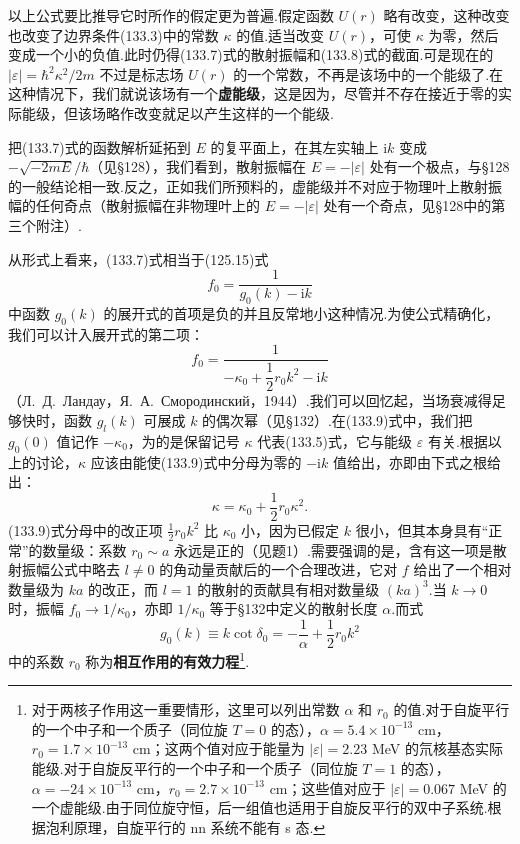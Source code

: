 以上公式要比推导它时所作的假定更为普遍.假定函数 $U(r)$ 略有改变，这种改变也改变了边界条件(133.3)中的常数 $\kappa$ 的值.适当改变 $U(r)$，可使 $\kappa$ 为零，然后变成一个小的负值.此时仍得(133.7)式的散射振幅和(133.8)式的截面.可是现在的 $|\varepsilon|=\hbar^2\kappa^2/2m$ 不过是标志场 $U(r)$ 的一个常数，不再是该场中的一个能级了.在这种情况下，我们就说该场有一个\textbf{虚能级}，这是因为，尽管并不存在接近于零的实际能级，但该场略作改变就足以产生这样的一个能级.

把(133.7)式的函数解析延拓到 $E$ 的复平面上，在其左实轴上 $\mathrm{i}k$ 变成 $-\sqrt{-2mE}/\hbar$（见§128），我们看到，散射振幅在 $E=-|\varepsilon|$ 处有一个极点，与§128的一般结论相一致.反之，正如我们所预料的，虚能级并不对应于物理叶上散射振幅的任何奇点（散射振幅在非物理叶上的 $E=-|\varepsilon|$ 处有一个奇点，见§128中的第三个附注）.

从形式上看来，(133.7)式相当于(125.15)式
\begin{equation*}
  f_0=\frac{1}{g_0(k)-\mathrm{i}k}
\end{equation*}
中函数 $g_0(k)$ 的展开式的首项是负的并且反常地小这种情况.为使公式精确化，我们可以计入展开式的第二项：
\begin{equation}
  f_0=\frac{1}{-\kappa_0+\dfrac{1}{2}r_0k^2-\mathrm{i}k}
\end{equation}
（Л.~Д.~Ландау，Я.~А.~Смородинский，1944）.我们可以回忆起，当场衰减得足够快时，函数 $g_l(k)$ 可展成 $k$ 的偶次幂（见§132）.在(133.9)式中，我们把 $g_0(0)$ 值记作 $-\kappa_0$，为的是保留记号 $\kappa$ 代表(133.5)式，它与能级 $\varepsilon$ 有关.根据以上的讨论，$\kappa$ 应该由能使(133.9)式中分母为零的 $-\mathrm{i}k$ 值给出，亦即由下式之根给出：
\begin{equation}
  \kappa=\kappa_0+\frac{1}{2}r_0\kappa^2.
\end{equation}
(133.9)式分母中的改正项 $\frac{1}{2}r_0k^2$ 比 $\kappa_0$ 小，因为已假定 $k$ 很小，但其本身具有“正常”的数量级：系数 $r_0\sim a$ 永远是正的（见题1）.需要强调的是，含有这一项是散射振幅公式中略去 $l\neq0$ 的角动量贡献后的一个合理改进，它对 $f$ 给出了一个相对数量级为 $ka$ 的改正，而 $l=1$ 的散射的贡献具有相对数量级 $(ka)^3$.当 $k\to0$ 时，振幅 $f_0\to1/\kappa_0$，亦即 $1/\kappa_0$ 等于§132中定义的散射长度 $\alpha$.而式
\begin{equation}
  g_0(k)\equiv k\cot\delta_0
  =-\frac{1}{\alpha}+\frac{1}{2}r_0k^2
\end{equation}
中的系数 $r_0$ 称为\textbf{相互作用的有效力程}\footnote{对于两核子作用这一重要情形，这里可以列出常数 $\alpha$ 和 $r_0$ 的值.对于自旋平行的一个中子和一个质子（同位旋 $T=0$ 的态），$\alpha=5.4\times10^{-13}$ cm，$r_0=1.7\times10^{-13}$ cm；这两个值对应于能量为 $|\varepsilon|=2.23$ MeV 的氘核基态实际能级.对于自旋反平行的一个中子和一个质子（同位旋 $T=1$ 的态），$\alpha=-24\times10^{-13}$ cm，$r_0=2.7\times10^{-13}$ cm；这些值对应于 $|\varepsilon|=0.067$ MeV 的一个虚能级.由于同位旋守恒，后一组值也适用于自旋反平行的双中子系统.根据泡利原理，自旋平行的 nn 系统不能有 s 态.}.

